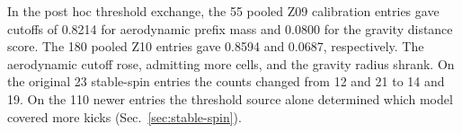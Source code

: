 In the post hoc threshold exchange, the 55 pooled Z09 calibration entries gave cutoffs of 0.8214 for aerodynamic prefix mass and 0.0800 for the gravity distance score. The 180 pooled Z10 entries gave 0.8594 and 0.0687, respectively. The aerodynamic cutoff rose, admitting more cells, and the gravity radius shrank. On the original 23 stable-spin entries the counts changed from 12 and 21 to 14 and 19. On the 110 newer entries the threshold source alone determined which model covered more kicks (Sec.~\ref{sec:stable-spin}).
